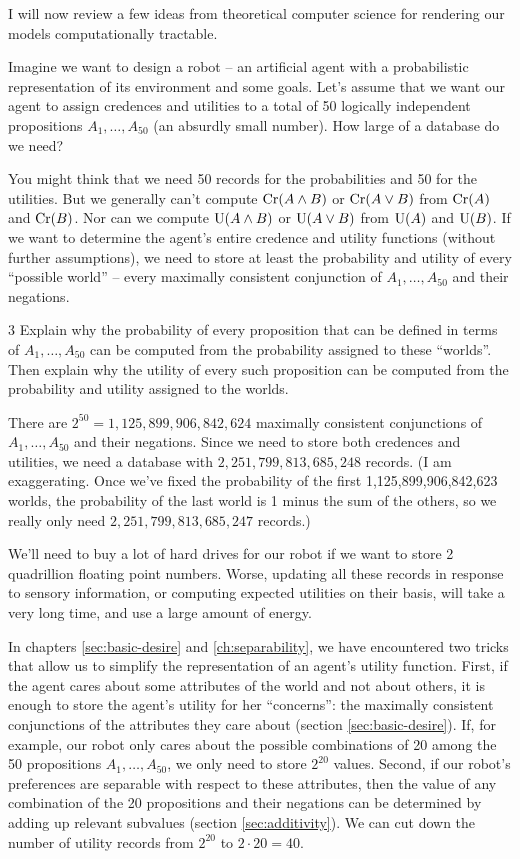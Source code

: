 I will now review a few ideas from theoretical computer science for rendering
our models computationally tractable.

Imagine we want to design a robot -- an artificial agent with a probabilistic
representation of its environment and some goals. Let's assume that we want our
agent to assign credences and utilities to a total of 50 logically independent
propositions $A_1,\ldots,A_{50}$ (an absurdly small number). How large of a
database do we need?

You might think that we need 50 records for the probabilities and 50 for the
utilities. But we generally can't compute $\text{Cr}(A \land B)$ or $\text{Cr}(A \lor B)$
from $\text{Cr}(A)$ and $\text{Cr}(B)$. Nor can we compute $\text{U}(A \land B)$ or $\text{U}(A \lor B)$
from $\text{U}(A)$ and $\text{U}(B)$. If we want to determine the agent's entire credence
and utility functions (without further assumptions), we need to store at least
the probability and utility of every ``possible world'' -- every maximally
consistent conjunction of $A_1,\ldots,A_{50}$ and their negations.

\begin{exercise}{3}
  Explain why the probability of every proposition that can be defined in terms
  of $A_1,\ldots,A_{50}$ can be computed from the probability assigned to these
  ``worlds''. Then explain why the utility of every such proposition can be
  computed from the probability and utility assigned to the worlds.
\end{exercise}

There are $2^{50} = 1,125,899,906,842,624$ maximally consistent conjunctions of
$A_1,\ldots,A_{50}$ and their negations. Since we need to store both credences
and utilities, we need a database with $2,251,799,813,685,248$ records. (I am
exaggerating. Once we've fixed the probability of the first
1,125,899,906,842,623 worlds, the probability of the last world is 1 minus the
sum of the others, so we really only need $2,251,799,813,685,247$ records.)

We'll need to buy a lot of hard drives for our robot if we want to store 2
quadrillion floating point numbers. Worse, updating all these records in
response to sensory information, or computing expected utilities on their basis,
will take a very long time, and use a large amount of energy.

In chapters \ref{sec:basic-desire} and \ref{ch:separability}, we have
encountered two tricks that allow us to simplify the representation of an
agent's utility function. First, if the agent cares about some attributes of the
world and not about others, it is enough to store the agent's utility for her
``concerns'': the maximally consistent conjunctions of the attributes they care
about (section \ref{sec:basic-desire}). If, for example, our robot only cares
about the possible combinations of 20 among the 50 propositions
$A_1,\ldots,A_{50}$, we only need to store $2^{20}$ values. Second, if our robot's
preferences are separable with respect to these attributes, then the value of
any combination of the 20 propositions and their negations can be determined by
adding up relevant subvalues (section \ref{sec:additivity}). We can cut down
the number of utility records from $2^{20}$ to $2 \cdot 20 = 40$.

